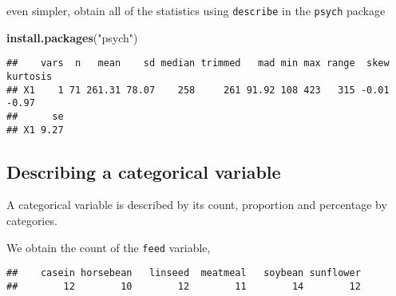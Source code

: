 \documentclass[]{book}
\newenvironment{Shaded}{\begin{snugshade}}{\end{snugshade}}
\newcommand{\KeywordTok}[1]{\textcolor[rgb]{0.13,0.29,0.53}{\textbf{{#1}}}}
\newcommand{\StringTok}[1]{\textcolor[rgb]{0.31,0.60,0.02}{{#1}}}
\newcommand{\NormalTok}[1]{{#1}}
\theoremstyle{definition}
\theoremstyle{definition}
\theoremstyle{remark}
\begin{document}
even simpler, obtain all of the statistics using \texttt{describe} in
the \texttt{psych} package

\begin{Shaded}
\begin{Highlighting}[]
\KeywordTok{install.packages}\NormalTok{(}\StringTok{"psych"}\NormalTok{)}
\end{Highlighting}
\end{Shaded}

\begin{Shaded}
\end{Shaded}

\begin{verbatim}
##    vars  n   mean    sd median trimmed   mad min max range  skew kurtosis
## X1    1 71 261.31 78.07    258     261 91.92 108 423   315 -0.01    -0.97
##      se
## X1 9.27
\end{verbatim}

\subsection{Describing a categorical
variable}\label{describing-a-categorical-variable}

A categorical variable is described by its count, proportion and
percentage by categories.

We obtain the count of the \texttt{feed} variable,

\begin{Shaded}
\end{Shaded}

\begin{verbatim}
##    casein horsebean   linseed  meatmeal   soybean sunflower 
##        12        10        12        11        14        12
\end{verbatim}

\begin{Shaded}
\end{Shaded}
\end{document}
